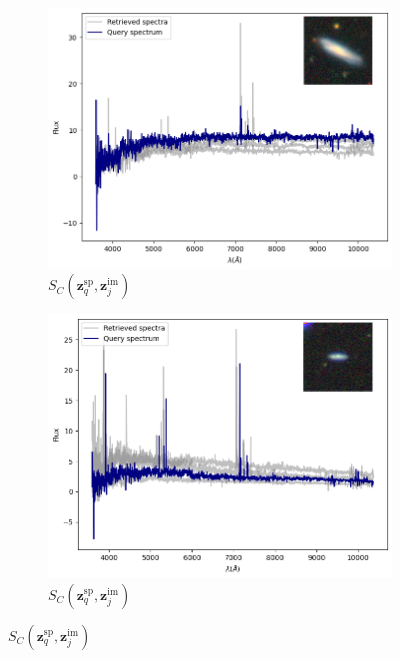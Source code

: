 \documentclass[draft, a4paper,12pt]{article}
\begin{document}
\begin{figure}[H]
    \begin{subfigure}[b]{0.45\textwidth}
        \centering
        \includegraphics[width=\textwidth]{../figures/spectral_retrieval_im_sp_1}
        \caption{$S_C(\mathbf{z}_q^{\text{sp}}, \mathbf{z}_j^{\text{im}})$}
        \label{fig:im_sp_1}
    \end{subfigure}%
    \hfill
    \begin{subfigure}[b]{0.45\textwidth}
        \centering
        \includegraphics[width=\textwidth]{../figures/spectral_retrieval_im_sp_2}
        \caption{$S_C(\mathbf{z}_q^{\text{sp}}, \mathbf{z}_j^{\text{im}})$}
        \label{fig:im_sp_2}
    \end{subfigure}


\end{figure}
\end{document}
